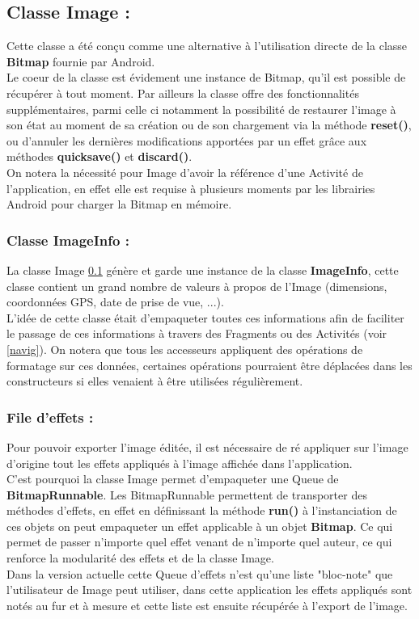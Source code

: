 \subsection{Classe \textbf{Image} :} \label{classeImage}
Cette classe a été conçu comme une alternative à l'utilisation directe de la classe \textbf{Bitmap} fournie par Android.
\\
Le coeur de la classe est évidement une instance de Bitmap, qu'il est possible de récupérer à tout moment. Par ailleurs la classe offre des fonctionnalités supplémentaires, parmi celle ci notamment la possibilité de restaurer l'image à son état au moment de sa création ou de son chargement via la méthode \textbf{reset()}, ou d'annuler les dernières modifications apportées par un effet grâce aux méthodes \textbf{quicksave()} et \textbf{discard()}.
\\

On notera la nécessité pour Image d'avoir la référence d'une Activité de l'application, en effet elle est requise à plusieurs moments par les librairies Android pour charger la Bitmap en mémoire.

\subsubsection{Classe \textbf{ImageInfo} :}
La classe Image \ref{classeImage} génère et garde une instance de la classe \textbf{ImageInfo}, cette classe contient un grand nombre de valeurs à propos de l'Image (dimensions, coordonnées GPS, date de prise de vue, ...).
\\
L'idée de cette classe était d'empaqueter toutes ces informations afin de faciliter le passage de ces informations à travers des Fragments ou des Activités (voir \ref{navig}). On notera que tous les accesseurs appliquent des opérations de formatage sur ces données, certaines opérations pourraient être déplacées dans les constructeurs si elles venaient à être utilisées régulièrement.


\subsubsection{File d'effets :} \label{file_effets}
Pour pouvoir exporter l'image éditée, il est nécessaire de ré appliquer sur l'image d'origine tout les effets appliqués à l'image affichée dans l'application.
\\
C'est pourquoi la classe Image permet d'empaqueter une Queue de \textbf{BitmapRunnable}. Les BitmapRunnable permettent de transporter des méthodes d'effets, en effet en définissant la méthode \textbf{run()} à l'instanciation de ces objets on peut empaqueter un effet applicable à un objet \textbf{Bitmap}. Ce qui permet de passer n'importe quel effet venant de n'importe quel auteur, ce qui renforce la modularité des effets et de la classe Image.
\\
Dans la version actuelle cette Queue d'effets n'est qu'une liste "bloc-note" que l'utilisateur de Image peut utiliser, dans cette application les effets appliqués sont notés au fur et à mesure et cette liste est ensuite récupérée à l'export de l'image.


